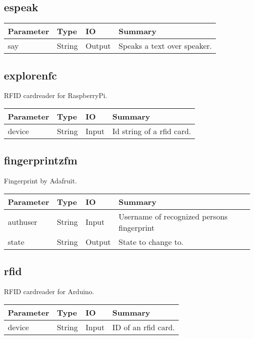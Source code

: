 \documentclass[english,a4paper,11pt]{report}
\begin{document}
\subsection{espeak}

\begin{center}
	\begin{tabular}{| l | l | l | l |}
		\hline
		Parameter & Type & IO & Summary \\ \hline
		say & String & Output & Speaks a text over speaker. \\
		\hline
	\end{tabular}
\end{center}

\subsection{explorenfc}
RFID cardreader for RaspberryPi.

\begin{center}
	\begin{tabular}{| l | l | l | l |}
		\hline
		Parameter & Type & IO & Summary \\ \hline
		device & String & Input & Id string of a rfid card. \\
		\hline
	\end{tabular}
\end{center}

\subsection{fingerprintzfm}
Fingerprint by Adafruit.
\begin{center}
	\begin{tabular}{| l | l | l | l |}
		\hline
		Parameter & Type & IO & Summary \\ \hline
		authuser & String & Input & Username of recognized persons fingerprint \\
		state & String & Output & State to change to. \\
		\hline
	\end{tabular}
\end{center}

\subsection{rfid}
RFID cardreader for Arduino.

\begin{center}
	\begin{tabular}{| l | l | l | l |}
		\hline
		Parameter & Type & IO & Summary \\ \hline
		device & String & Input & ID of an rfid card. \\
		\hline
	\end{tabular}
\end{center}
\end{document}
